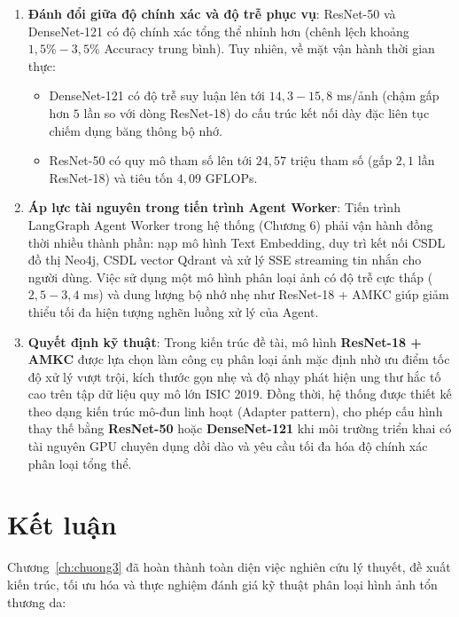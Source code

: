 \begin{enumerate}
  \item \textbf{Đánh đổi giữa độ chính xác và độ trễ phục vụ}:
  ResNet-50 và DenseNet-121 có độ chính xác tổng thể nhỉnh hơn (chênh lệch khoảng $1{,}5\% - 3{,}5\%$ Accuracy trung bình). Tuy nhiên, về mặt vận hành thời gian thực:
  \begin{itemize}
    \item DenseNet-121 có độ trễ suy luận lên tới $14{,}3 - 15{,}8$ ms/ảnh (chậm gấp hơn $5$ lần so với dòng ResNet-18) do cấu trúc kết nối dày đặc liên tục chiếm dụng băng thông bộ nhớ.
    \item ResNet-50 có quy mô tham số lên tới $24{,}57$ triệu tham số (gấp $2{,}1$ lần ResNet-18) và tiêu tốn $4{,}09$ GFLOPs.
  \end{itemize}

  \item \textbf{Áp lực tài nguyên trong tiến trình Agent Worker}:
  Tiến trình LangGraph Agent Worker trong hệ thống (Chương 6) phải vận hành đồng thời nhiều thành phần: nạp mô hình Text Embedding, duy trì kết nối CSDL đồ thị Neo4j, CSDL vector Qdrant và xử lý SSE streaming tin nhắn cho người dùng. Việc sử dụng một mô hình phân loại ảnh có độ trễ cực thấp ($2{,}5 - 3{,}4$ ms) và dung lượng bộ nhớ nhẹ như ResNet-18 + AMKC giúp giảm thiểu tối đa hiện tượng nghẽn luồng xử lý của Agent.

  \item \textbf{Quyết định kỹ thuật}:
  Trong kiến trúc đề tài, mô hình \textbf{ResNet-18 + AMKC} được lựa chọn làm công cụ phân loại ảnh mặc định nhờ ưu điểm tốc độ xử lý vượt trội, kích thước gọn nhẹ và độ nhạy phát hiện ung thư hắc tố cao trên tập dữ liệu quy mô lớn ISIC 2019. Đồng thời, hệ thống được thiết kế theo dạng kiến trúc mô-đun linh hoạt (Adapter pattern), cho phép cấu hình thay thế bằng \textbf{ResNet-50} hoặc \textbf{DenseNet-121} khi môi trường triển khai có tài nguyên GPU chuyên dụng dồi dào và yêu cầu tối đa hóa độ chính xác phân loại tổng thể.
\end{enumerate}

\section{Kết luận}

Chương~\ref{ch:chuong3} đã hoàn thành toàn diện việc nghiên cứu lý thuyết, đề xuất kiến trúc, tối ưu hóa và thực nghiệm đánh giá kỹ thuật phân loại hình ảnh tổn thương da:

